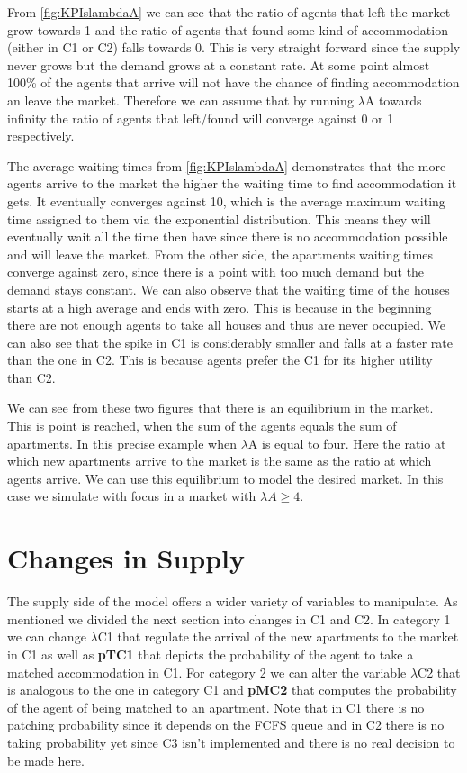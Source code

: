 From \ref{fig:KPIslambdaA} we can see that the ratio of agents that left the market grow towards 1 and the ratio of agents that found some kind of accommodation (either in C1 or C2) falls towards 0. This is very straight forward since the supply never grows but the demand grows at a constant rate. At some point almost 100\% of the agents that arrive will not have the chance of finding accommodation an leave the market. Therefore we can assume that by running $\lambda$A towards infinity the ratio of agents that left/found will converge against 0 or 1 respectively.

The average waiting times from \ref{fig:KPIslambdaA} demonstrates that the more agents arrive to the market the higher the waiting time to find accommodation it gets. It eventually converges against 10, which is the average maximum waiting time assigned to them via the exponential distribution. This means they will eventually wait all the time then have since there is no accommodation possible and will leave the market. From the other side, the apartments waiting times converge against zero, since there is a point with too much demand but the demand stays constant. We can also observe that the waiting time of the houses starts at a high average and ends with zero. This is because in the beginning there are not enough agents to take all houses and thus are never occupied. We can also see that the spike in C1 is considerably smaller and falls at a faster rate than the one in C2. This is because agents prefer the C1 for its higher utility than C2.

We can see from these two figures that there is an equilibrium in the market. This is point is reached, when the sum of the agents equals the sum of apartments. In this precise example when $\lambda$A is equal to four. Here the ratio at which new apartments arrive to the market is the same as the ratio at which agents arrive. We can use this equilibrium to model the desired market. In this case we simulate with focus in a market with $\lambda A \geq 4$. 


\section{Changes in Supply}

The supply side of the model offers a wider variety of variables to manipulate. As mentioned we divided the next section into changes in C1 and C2. In category 1 we can change $\lambda$C1 that regulate the arrival of the new apartments to the market in C1 as well as \textbf{pTC1} that depicts the probability of the agent to take a matched accommodation in C1. For category 2 we can alter the variable $\lambda$C2 that is analogous to the one in category C1 and \textbf{pMC2} that computes the probability of the agent of being matched to an apartment. Note that in C1 there is no patching probability since it depends on the FCFS queue and in C2 there is no taking probability yet since C3 isn't implemented and there is no real decision to be made here.

